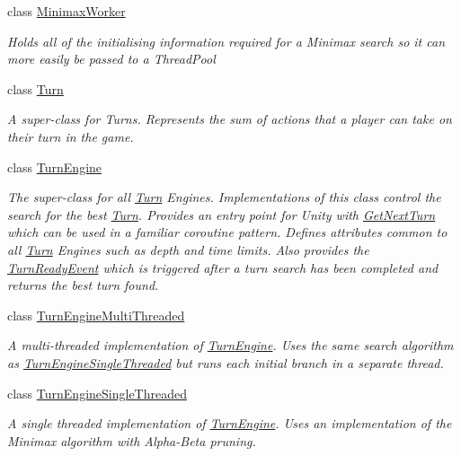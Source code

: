 \begin{DoxyCompactItemize}
class \hyperlink{class_universal_turn_based_a_i_1_1_minimax_worker}{Minimax\+Worker}
\begin{DoxyCompactList}\small\item\em Holds all of the initialising information required for a Minimax search so it can more easily be passed to a Thread\+Pool \end{DoxyCompactList}\item 
class \hyperlink{class_universal_turn_based_a_i_1_1_turn}{Turn}
\begin{DoxyCompactList}\small\item\em A super-\/class for Turns. Represents the sum of actions that a player can take on their turn in the game. \end{DoxyCompactList}\item 
class \hyperlink{class_universal_turn_based_a_i_1_1_turn_engine}{Turn\+Engine}
\begin{DoxyCompactList}\small\item\em The super-\/class for all \hyperlink{class_universal_turn_based_a_i_1_1_turn}{Turn} Engines. Implementations of this class control the search for the best \hyperlink{class_universal_turn_based_a_i_1_1_turn}{Turn}. Provides an entry point for Unity with \hyperlink{class_universal_turn_based_a_i_1_1_turn_engine_ae2a5b877b8194f05dc970226722515ee}{Get\+Next\+Turn} which can be used in a familiar coroutine pattern. Defines attributes common to all \hyperlink{class_universal_turn_based_a_i_1_1_turn}{Turn} Engines such as depth and time limits. Also provides the \hyperlink{class_universal_turn_based_a_i_1_1_turn_engine_af10115494121382d2966a8fc9fe4c9a0}{Turn\+Ready\+Event} which is triggered after a turn search has been completed and returns the best turn found. \end{DoxyCompactList}\item 
class \hyperlink{class_universal_turn_based_a_i_1_1_turn_engine_multi_threaded}{Turn\+Engine\+Multi\+Threaded}
\begin{DoxyCompactList}\small\item\em A multi-\/threaded implementation of \hyperlink{class_universal_turn_based_a_i_1_1_turn_engine}{Turn\+Engine}. Uses the same search algorithm as \hyperlink{class_universal_turn_based_a_i_1_1_turn_engine_single_threaded}{Turn\+Engine\+Single\+Threaded} but runs each initial branch in a separate thread. \end{DoxyCompactList}\item 
class \hyperlink{class_universal_turn_based_a_i_1_1_turn_engine_single_threaded}{Turn\+Engine\+Single\+Threaded}
\begin{DoxyCompactList}\small\item\em A single threaded implementation of \hyperlink{class_universal_turn_based_a_i_1_1_turn_engine}{Turn\+Engine}. Uses an implementation of the Minimax algorithm with Alpha-\/\+Beta pruning. \end{DoxyCompactList}\end{DoxyCompactItemize}

